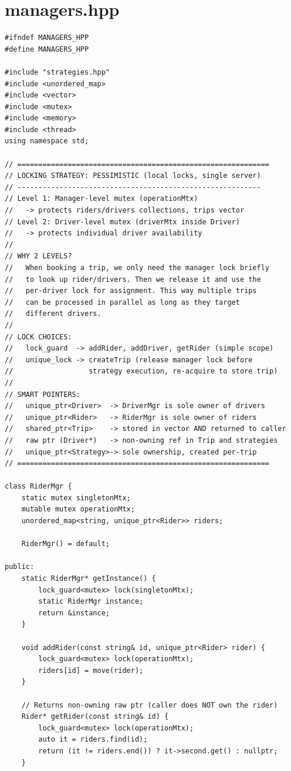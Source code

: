 \documentclass[11pt,a4paper]{article}
\begin{document}
\section{managers.hpp}
\begin{lstlisting}[title={\texttt{managers.hpp}}]
#ifndef MANAGERS_HPP
#define MANAGERS_HPP

#include "strategies.hpp"
#include <unordered_map>
#include <vector>
#include <mutex>
#include <memory>
#include <thread>
using namespace std;

// ============================================================
// LOCKING STRATEGY: PESSIMISTIC (local locks, single server)
// ----------------------------------------------------------
// Level 1: Manager-level mutex (operationMtx)
//   -> protects riders/drivers collections, trips vector
// Level 2: Driver-level mutex (driverMtx inside Driver)
//   -> protects individual driver availability
//
// WHY 2 LEVELS?
//   When booking a trip, we only need the manager lock briefly
//   to look up rider/drivers. Then we release it and use the
//   per-driver lock for assignment. This way multiple trips
//   can be processed in parallel as long as they target
//   different drivers.
//
// LOCK CHOICES:
//   lock_guard  -> addRider, addDriver, getRider (simple scope)
//   unique_lock -> createTrip (release manager lock before
//                  strategy execution, re-acquire to store trip)
//
// SMART POINTERS:
//   unique_ptr<Driver>  -> DriverMgr is sole owner of drivers
//   unique_ptr<Rider>   -> RiderMgr is sole owner of riders
//   shared_ptr<Trip>    -> stored in vector AND returned to caller
//   raw ptr (Driver*)   -> non-owning ref in Trip and strategies
//   unique_ptr<Strategy>-> sole ownership, created per-trip
// ============================================================

class RiderMgr {
    static mutex singletonMtx;
    mutable mutex operationMtx;
    unordered_map<string, unique_ptr<Rider>> riders;

    RiderMgr() = default;

public:
    static RiderMgr* getInstance() {
        lock_guard<mutex> lock(singletonMtx);
        static RiderMgr instance;
        return &instance;
    }

    void addRider(const string& id, unique_ptr<Rider> rider) {
        lock_guard<mutex> lock(operationMtx);
        riders[id] = move(rider);
    }

    // Returns non-owning raw ptr (caller does NOT own the rider)
    Rider* getRider(const string& id) {
        lock_guard<mutex> lock(operationMtx);
        auto it = riders.find(id);
        return (it != riders.end()) ? it->second.get() : nullptr;
    }


\end{lstlisting}
\end{document}
